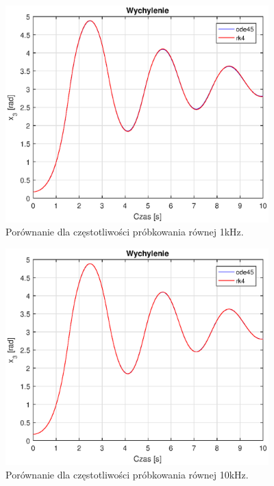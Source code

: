 \begin{figure}[h]
	\centering
	\includegraphics[width=4in]{Figures/wychylenie_1khz.eps}
	\caption{Porównanie dla częstotliwości próbkowania równej 1kHz.}
	\label{fig:wychylenie_1khz}
\end{figure}

\begin{figure}[h]
	\centering
	\includegraphics[width=4in]{Figures/wychylenie_10khz.eps}
	\caption{Porównanie dla częstotliwości próbkowania równej 10kHz.}
	\label{fig:wychylenie_10khz}
\end{figure}